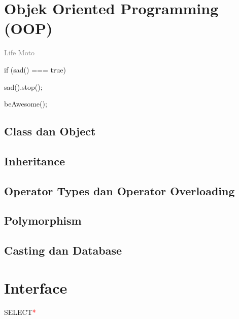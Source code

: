 \documentclass[11pt,b5paper,oneside,titlepage]{book}
\begin{document}
	\part{Objek Oriented Programming (OOP)}
\begingroup
\thispagestyle{empty}
\par\normalfont\fontsize{35}{35}\sffamily\selectfont
\textcolor{gray}{ \textfractionsolidus{} \textfractionsolidus{} Life Moto}

if (sad() === true){

	sad().stop();

	beAwesome();
}

\endgroup
	\chapter{Class dan Object}\label{class-dan-object}
	
	
	\chapter{Inheritance}\label{inheritance}
	
	
	\chapter{Operator Types dan Operator Overloading}\label{operator-types-dan-operator-overloading}
	
	
	\chapter{Polymorphism}\label{polymorphism}
	

	\chapter{Casting dan Database}\label{casting-dan-database}
	

	\part{Interface}
\begingroup
\thispagestyle{empty}
\vspace*{5cm}
\par\normalfont\fontsize{35}{35}\sffamily\selectfont
SELECT\textcolor{red}{*}
\end{document}
